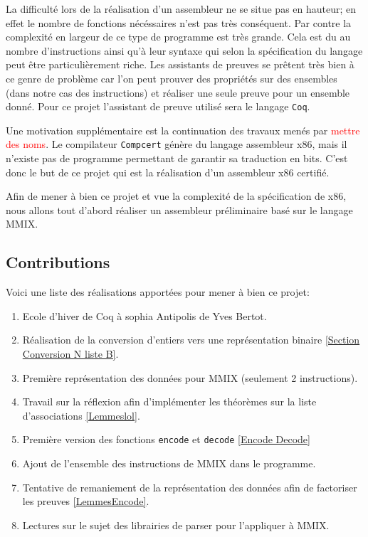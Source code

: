 \documentclass {article}
\theoremstyle{definition}
\theoremstyle{remark}
\newcommand{\todo}[1]{\textcolor{red}{#1}}
\newcommand{\fun}[1]{\lstinline!#1!}
\begin{document}
La difficulté lors de la réalisation d'un assembleur ne se situe pas en hauteur; en effet le nombre de
fonctions nécéssaires n'est pas très conséquent. Par contre la complexité en largeur
de ce type de programme est très grande. Cela est du au nombre d'instructions ainsi qu'à leur syntaxe qui selon
la spécification du langage peut être particulièrement riche.
Les assistants de preuves se prêtent très bien à ce genre de problème car l'on peut prouver des
propriétés sur des ensembles (dans notre cas des instructions) et réaliser une seule preuve pour
un ensemble donné. Pour ce projet l'assistant de preuve utilisé sera le langage \fun{Coq}.

Une motivation supplémentaire est la continuation des travaux menés par \todo{mettre des noms}.
Le compilateur \fun{Compcert} génère du langage assembleur x86, mais il n'existe pas
de programme permettant de garantir sa traduction en bits.
C'est donc le but de ce projet qui est la réalisation d'un assembleur x86 certifié.

Afin de mener à bien ce projet et vue la complexité de la spécification de x86,
nous allons tout d'abord réaliser un assembleur préliminaire basé sur le langage MMIX.



\subsection{Contributions}
Voici une liste des réalisations apportées pour mener à bien ce projet:
\begin{enumerate}
\item Ecole d'hiver de Coq à sophia Antipolis de Yves Bertot.
\item Réalisation de la conversion d'entiers vers une représentation binaire \ref{Section Conversion N liste B}.
\item Première représentation des données pour MMIX (seulement 2 instructions).
\item Travail sur la réflexion afin d'implémenter les théorèmes sur la liste d'associations \ref{Lemmeslol}.
\item Première version des fonctions \fun{encode} et \fun{decode} \ref{Encode Decode}
\item Ajout de l'ensemble des instructions de MMIX dans le programme.
\item Tentative de remaniement de la représentation des données afin de factoriser les preuves \ref{LemmesEncode}.
\item Lectures sur le sujet des librairies de parser pour l'appliquer à MMIX.
\end{enumerate}
\end{document}
